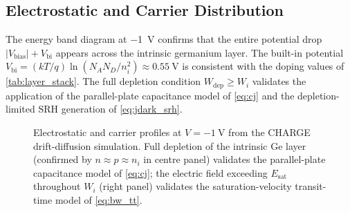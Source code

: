 \subsection{Electrostatic and Carrier Distribution}
\label{subsec:pd_elec_profiles}

The energy band diagram at \SI{-1}{\volt} confirms that the entire potential
drop $|V_{\mathrm{bias}}|+V_{\mathrm{bi}}$ appears across the intrinsic
germanium layer. The built-in potential
$V_{\mathrm{bi}}=(kT/q)\ln(N_AN_D/n_i^2)\approx\SI{0.55}{\volt}$ is consistent
with the doping values of \cref{tab:layer_stack}. The full depletion condition
$W_{\mathrm{dep}}\geq W_i$ validates the application of the parallel-plate
capacitance model of \cref{eq:cj} and the depletion-limited SRH generation
of \cref{eq:jdark_srh}.

\begin{figure}[H]
    \centering
    \caption{Electrostatic and carrier profiles at $V=\SI{-1}{\volt}$ from the
    CHARGE drift-diffusion simulation. Full depletion of the intrinsic Ge layer
    (confirmed by $n\approx p\approx n_i$ in centre panel) validates the
    parallel-plate capacitance model of \cref{eq:cj}; the electric field
    exceeding $E_{\mathrm{sat}}$ throughout $W_i$ (right panel) validates the
    saturation-velocity transit-time model of \cref{eq:bw_tt}.}
    \label{fig:band_carrier_field}
\end{figure}

